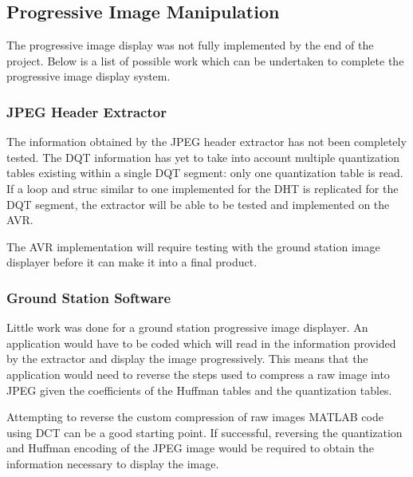 \subsection{Progressive Image Manipulation}

The progressive image display was not fully implemented
by the end of the project. Below is a list of possible work
which can be undertaken to complete the progressive
image display system.

\subsubsection{JPEG Header Extractor}

The information obtained by the JPEG header extractor
has not been completely tested. The DQT information 
has yet to take into account multiple quantization tables
existing within a single DQT segment: only one 
quantization table is read. If a loop and struc similar to 
one implemented for the DHT is replicated for the DQT
segment, the extractor will be able to be tested and
implemented on the AVR.

The AVR implementation will require testing with
the ground station image displayer before it
can make it into a final product.

\subsubsection{Ground Station Software}

Little work was done for a ground station
progressive image displayer. An application would have
to be coded which will read in the information provided by
the extractor and display the image progressively.
This means that the application would need to reverse the
steps used to compress a raw image into JPEG given the 
coefficients of the Huffman tables and the quantization
tables. 

Attempting to reverse the custom compression of 
raw images MATLAB code using DCT can be a good 
starting point. If successful, reversing the quantization 
and Huffman encoding of the JPEG image would be 
required to obtain the information 
necessary to display the image.
